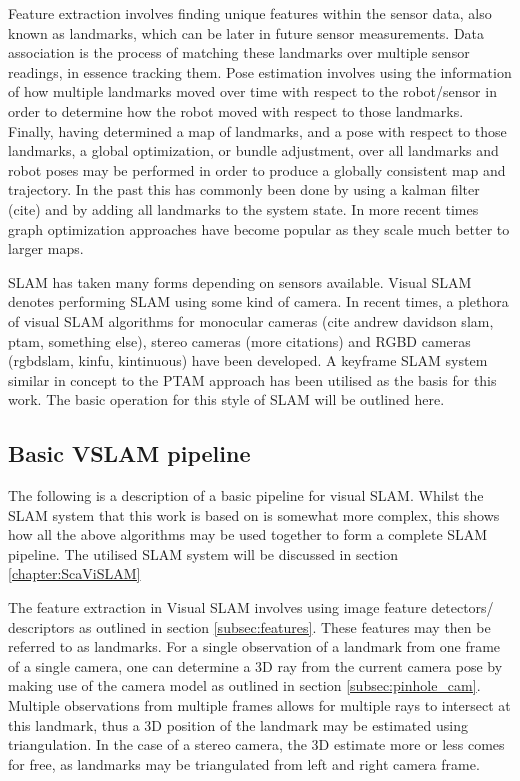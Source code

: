 Feature extraction involves finding unique features within the sensor data, also known as landmarks, which can be later in future sensor measurements.  Data association is the process of matching these landmarks over multiple sensor readings, in essence tracking them.  Pose estimation involves using the information of how multiple landmarks moved over time with respect to the robot/sensor in order to determine how the robot moved with respect to those landmarks.  Finally, having determined a map of landmarks, and a pose with respect to those landmarks, a global optimization, or bundle adjustment, over all landmarks and robot poses may be performed in order to produce a globally consistent map and trajectory.  In the past this has commonly been done by using a kalman filter (cite) and by adding all landmarks to the system state. In more recent times graph optimization approaches have become popular as they scale much better to larger maps.

SLAM has taken many forms depending on sensors available. Visual SLAM denotes performing SLAM using some kind of camera.  In recent times, a plethora of visual SLAM algorithms for monocular cameras (cite andrew davidson slam, ptam, something else), stereo cameras (more citations) and RGBD cameras (rgbdslam, kinfu, kintinuous) have been developed.  A keyframe SLAM system similar in concept to the PTAM approach has been utilised as the basis for this work.  The basic operation for this style of SLAM will be outlined here.

\subsection{Basic VSLAM pipeline}

The following is a description of a basic pipeline for visual SLAM.  Whilst the SLAM system that this work is based on is somewhat more complex, this shows how all the above algorithms may be used together to form a complete SLAM pipeline.  The utilised SLAM system will be discussed in section \ref{chapter:ScaViSLAM}

The feature extraction in Visual SLAM involves using image feature detectors/ descriptors as outlined in section \ref{subsec:features}.  These features may then be referred to as landmarks. For a single observation of a landmark from one frame of a single camera, one can determine a 3D ray from the current camera pose by making use of the camera model as outlined in section \ref{subsec:pinhole_cam}.  Multiple observations from multiple frames allows for multiple rays to intersect at this landmark, thus a 3D position of the landmark may be estimated using triangulation. In the case of a stereo camera, the 3D estimate more or less comes for free, as landmarks may be triangulated from left and right camera frame.

